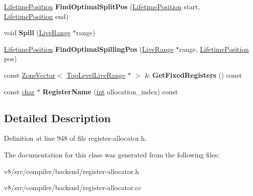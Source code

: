 \begin{DoxyCompactItemize}
\item 
\mbox{\label{classv8_1_1internal_1_1compiler_1_1RegisterAllocator_a95714b88dadd2a8bafbaedc614eca6f6}} 
\mbox{\hyperlink{classv8_1_1internal_1_1compiler_1_1LifetimePosition}{Lifetime\+Position}} {\bfseries Find\+Optimal\+Split\+Pos} (\mbox{\hyperlink{classv8_1_1internal_1_1compiler_1_1LifetimePosition}{Lifetime\+Position}} start, \mbox{\hyperlink{classv8_1_1internal_1_1compiler_1_1LifetimePosition}{Lifetime\+Position}} end)
\item 
\mbox{\label{classv8_1_1internal_1_1compiler_1_1RegisterAllocator_a629789d8d5ce5de31c3a5c8011a592fc}} 
void {\bfseries Spill} (\mbox{\hyperlink{classv8_1_1internal_1_1compiler_1_1LiveRange}{Live\+Range}} $\ast$range)
\item 
\mbox{\label{classv8_1_1internal_1_1compiler_1_1RegisterAllocator_ad30a3b9ae9719de4e5bd9f1f6b2e3fbf}} 
\mbox{\hyperlink{classv8_1_1internal_1_1compiler_1_1LifetimePosition}{Lifetime\+Position}} {\bfseries Find\+Optimal\+Spilling\+Pos} (\mbox{\hyperlink{classv8_1_1internal_1_1compiler_1_1LiveRange}{Live\+Range}} $\ast$range, \mbox{\hyperlink{classv8_1_1internal_1_1compiler_1_1LifetimePosition}{Lifetime\+Position}} pos)
\item 
\mbox{\label{classv8_1_1internal_1_1compiler_1_1RegisterAllocator_ae2174cad1f1656d126f0a47c1586c674}} 
const \mbox{\hyperlink{classv8_1_1internal_1_1ZoneVector}{Zone\+Vector}}$<$ \mbox{\hyperlink{classv8_1_1internal_1_1compiler_1_1TopLevelLiveRange}{Top\+Level\+Live\+Range}} $\ast$ $>$ \& {\bfseries Get\+Fixed\+Registers} () const
\item 
\mbox{\label{classv8_1_1internal_1_1compiler_1_1RegisterAllocator_a47d1062f896dc303472f4f40572e96a6}} 
const \mbox{\hyperlink{classchar}{char}} $\ast$ {\bfseries Register\+Name} (\mbox{\hyperlink{classint}{int}} allocation\+\_\+index) const
\end{DoxyCompactItemize}


\subsection{Detailed Description}


Definition at line 948 of file register-\/allocator.\+h.



The documentation for this class was generated from the following files\+:\begin{DoxyCompactItemize}
\item 
v8/src/compiler/backend/register-\/allocator.\+h\item 
v8/src/compiler/backend/register-\/allocator.\+cc\end{DoxyCompactItemize}
